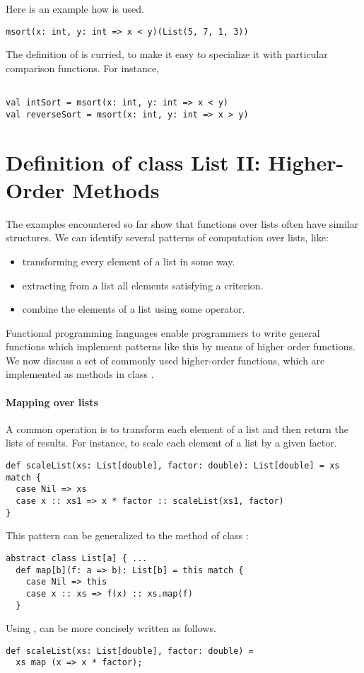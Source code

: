 Here is an example how  is used.
\begin{lstlisting}
msort(x: int, y: int => x < y)(List(5, 7, 1, 3))
\end{lstlisting}
The definition of  is curried, to make it easy to specialize it with particular
comparison functions. For instance,
\begin{lstlisting}

val intSort = msort(x: int, y: int => x < y)
val reverseSort = msort(x: int, y: int => x > y)
\end{lstlisting}

\section{Definition of class List II: Higher-Order Methods}

The examples encountered so far show that functions over lists often
have similar structures. We can identify several patterns of
computation over lists, like:
\begin{itemize}
      \item transforming every element of a list in some way.
      \item extracting from a list all elements satisfying a criterion.
      \item combine the elements of a list using some operator.
\end{itemize}
Functional programming languages enable programmers to write general
functions which implement patterns like this by means of higher order
functions. We now discuss a set of commonly used higher-order
functions, which are implemented as methods in class .

\paragraph{Mapping over lists}
A common operation is to transform each element of a list and then
return the lists of results.  For instance, to scale each element of a
list by a given factor.
\begin{lstlisting}
def scaleList(xs: List[double], factor: double): List[double] = xs match {
  case Nil => xs
  case x :: xs1 => x * factor :: scaleList(xs1, factor)
}
\end{lstlisting}
This pattern can be generalized to the  method of class :
\begin{lstlisting}
abstract class List[a] { ...
  def map[b](f: a => b): List[b] = this match {
    case Nil => this
    case x :: xs => f(x) :: xs.map(f)
  }
\end{lstlisting}
Using ,  can be more concisely written as follows.
\begin{lstlisting}
def scaleList(xs: List[double], factor: double) = 
  xs map (x => x * factor);
\end{lstlisting}

